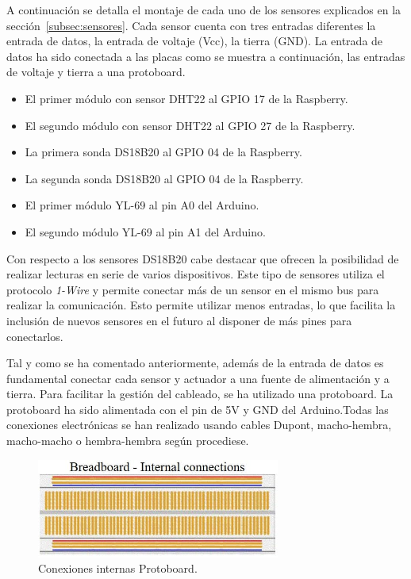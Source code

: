 \documentclass[a4paper, 12pt, oneside]{book}
\begin{document}
A continuación se detalla el montaje de cada uno de los sensores explicados en la sección~\ref{subsec:sensores}. Cada sensor cuenta con tres entradas diferentes la entrada de datos, la entrada de voltaje (Vcc), la tierra (GND). La entrada de datos ha sido conectada a las placas como se muestra a continuación, las entradas de voltaje y tierra a una protoboard. 

\begin{itemize}
	\item El primer módulo con sensor DHT22 al GPIO 17 de la Raspberry.
	\item El segundo módulo con sensor DHT22 al GPIO 27 de la Raspberry.
		\item La primera sonda DS18B20 al GPIO 04 de la Raspberry.
	\item La segunda sonda DS18B20 al GPIO 04 de la Raspberry.
	\item El primer módulo YL-69 al pin A0 del Arduino.
	\item El segundo módulo YL-69 al pin A1 del Arduino.
\end{itemize}

Con respecto a los sensores DS18B20 cabe destacar que ofrecen la posibilidad de realizar lecturas en serie de varios dispositivos. Este tipo de sensores utiliza el protocolo \textit{1-Wire} y permite conectar más de un sensor en el mismo bus para realizar la comunicación. Esto permite utilizar menos entradas, lo que facilita la inclusión de nuevos sensores en el futuro al disponer de más pines para conectarlos.

Tal y como se ha comentado anteriormente, además de la entrada de datos es fundamental conectar cada sensor y actuador a una fuente de alimentación y a tierra. Para facilitar la gestión del cableado, se ha utilizado una protoboard. La protoboard ha sido alimentada con el pin de 5V y GND del Arduino.Todas las conexiones electrónicas se han realizado usando cables Dupont, macho-hembra, macho-macho o hembra-hembra según procediese.

\begin{figure}[H]
	\centering
    \includegraphics[width=8cm, keepaspectratio]{img/protoboard-conexiones-internas}
    \caption{Conexiones internas Protoboard.}
    \label{figura:conexiones_protoborad}
\end{figure}
\end{document}
